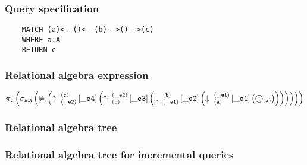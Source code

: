 	\subsubsection*{Query specification}

	\begin{lstlisting}
	MATCH (a)<--()<--(b)-->()-->(c)
	WHERE a:A
	RETURN c
	\end{lstlisting}


	\subsubsection*{Relational algebra expression}

	$\projection{\var{c}} \left(\selection{\mathtt{a:A}} \left(\alldifferent{} \left(\expandout{\_e2}{c}{}{\_e4}{} \left(\expandout{b}{\_e2}{}{\_e3}{} \left(\expandin{\_e1}{b}{}{\_e2}{} \left(\expandin{a}{\_e1}{}{\_e1}{} \left(\getvertices{a}{}\right)\right)\right)\right)\right)\right)\right)$

	\subsubsection*{Relational algebra tree}


	\subsubsection*{Relational algebra tree for incremental queries}

